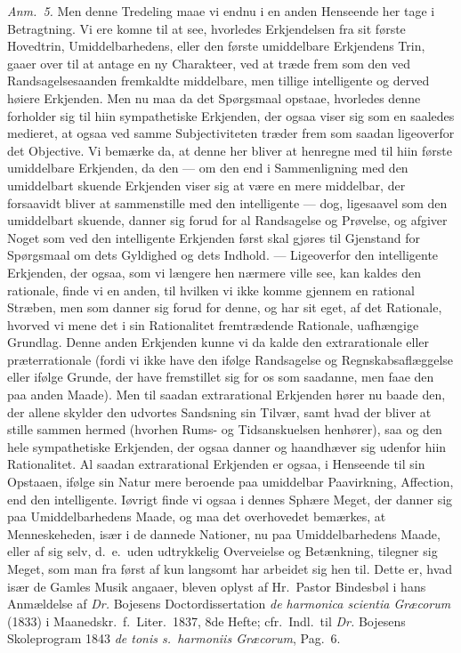 \documentclass[12pt,a4paper]{book}
\begin{document}
{\small\emph{Anm.~5.} Men denne Tredeling maae vi endnu i en anden Henseende her
tage i Betragtning. Vi ere komne til at see, hvorledes Erkjendelsen fra sit
første Hovedtrin, Umiddelbarhedens, eller den første umiddelbare Erkjendens
Trin, gaaer over til at antage en ny Charakteer, ved at træde frem som den ved
Randsagelsesaanden fremkaldte middelbare, men tillige intelligente og derved
høiere Erkjenden. Men nu maa da det Spørgsmaal opstaae, hvorledes denne forholder
sig til hiin sympathetiske Erkjenden, der ogsaa viser sig som en saaledes
medieret, at ogsaa ved samme Subjectiviteten træder frem som saadan ligeoverfor
det Objective. Vi bemærke da, at denne her bliver at henregne med til hiin første
umiddelbare Erkjenden, da den --- om den end i Sammenligning med den umiddelbart
skuende Erkjenden viser sig at være en mere middelbar, der forsaavidt bliver at
sammenstille med den intelligente --- dog, ligesaavel som den umiddelbart
skuende, danner sig forud for al Randsagelse og Prøvelse, og afgiver Noget som
ved den intelligente Erkjenden først skal gjøres til Gjenstand for Spørgsmaal om
dets Gyldighed og dets Indhold. --- Ligeoverfor den intelligente Erkjenden, der
ogsaa, som vi længere hen nærmere ville see, kan kaldes den rationale, finde vi
en anden, til hvilken vi ikke komme gjennem en rational Stræben, men som danner
sig forud for denne, og har sit eget, af det Rationale, hvorved vi mene det i sin
Rationalitet fremtrædende Rationale, uafhængige Grundlag. Denne anden Erkjenden
kunne vi da kalde den extrarationale eller præterrationale (fordi vi ikke have
den ifølge Randsagelse og Regnskabsaflæggelse eller ifølge Grunde, der have
fremstillet sig for os som saadanne, men faae den paa anden Maade). Men til
saadan extrarational Erkjenden hører nu baade den, der allene skylder den
udvortes Sandsning sin Tilvær, samt hvad der bliver at stille sammen hermed
(hvorhen Rums- og Tidsanskuelsen henhører), saa og den hele sympathetiske
Erkjenden, der ogsaa danner og haandhæver sig udenfor hiin Rationalitet. Al
saadan extrarational Erkjenden er ogsaa, i Henseende til sin Opstaaen, ifølge sin
Natur mere beroende paa umiddelbar Paavirkning, Affection, end den intelligente.
Iøvrigt finde vi ogsaa i dennes Sphære Meget, der danner sig paa Umiddelbarhedens
Maade, og maa det overhovedet bemærkes, at Menneskeheden, især i de dannede
Nationer, nu paa Umiddelbarhedens Maade, eller af sig selv, d.\ e.\ uden
udtrykkelig Overveielse og Betænkning, tilegner sig Meget, som man fra først af
kun langsomt har arbeidet sig hen til. Dette er, hvad især de Gamles Musik
angaaer, bleven oplyst af Hr.\ Pastor Bindesbøl i hans Anmældelse af \emph{Dr.}
Bojesens Doctordissertation \textit{de harmonica scientia Græcorum} (1833) i
Maanedskr.\ f.\ Liter.\ 1837, 8de Hefte; cfr.\ Indl.\ til \emph{Dr.} Bojesens
Skoleprogram 1843 \textit{de tonis s.\ harmoniis Græcorum}, Pag.\ 6.\par}
\end{document}
